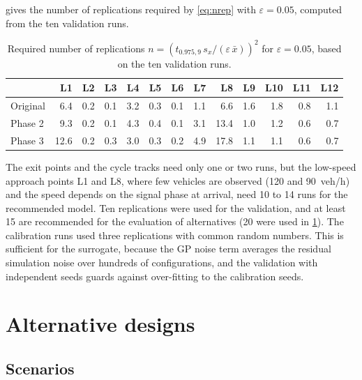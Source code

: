 \documentclass[11pt,a4paper]{article}
\begin{document}
 gives the number of replications required by \cref{eq:nrep} with
$\varepsilon = 0.05$, computed from the ten validation runs.

\begin{table}[!htb]
\centering
\caption[Required number of replications]{Required number of replications
$n = (t_{0.975,9}\,s_x/(\varepsilon\,\bar x))^2$ for $\varepsilon = 0.05$, based on the ten
validation runs.}
\label{tab:repl}
\footnotesize
\setlength{\tabcolsep}{4pt}
\begin{tabular}{lrrrrrrrrrrrr}
\toprule
& L1 & L2 & L3 & L4 & L5 & L6 & L7 & L8 & L9 & L10 & L11 & L12\\
\midrule
Original & 6.4  & 0.2 & 0.1 & 3.2 & 0.3 & 0.1 & 1.1 & 6.6  & 1.6 & 1.8 & 0.8 & 1.1\\
Phase 2  & 9.3  & 0.2 & 0.1 & 4.3 & 0.4 & 0.1 & 3.1 & 13.4 & 1.0 & 1.2 & 0.6 & 0.7\\
Phase 3  & 12.6 & 0.2 & 0.3 & 3.0 & 0.3 & 0.2 & 4.9 & 17.8 & 1.1 & 1.1 & 0.6 & 0.7\\
\bottomrule
\end{tabular}
\end{table}

The exit points and the cycle tracks need only one or two runs, but the low-speed approach points
L1 and L8, where few vehicles are observed (120 and 90~veh/h) and the speed depends on the signal
phase at arrival, need 10 to 14 runs for the recommended model. Ten replications were used for the
validation, and at least 15 are recommended for the evaluation of alternatives (20 were used in
\cref{sec:alternatives}). The calibration runs used three replications with common random numbers.
This is sufficient for the surrogate, because the GP noise term averages the residual simulation
noise over hundreds of configurations, and the validation with independent seeds guards against
over-fitting to the calibration seeds.

\section{Alternative designs}
\label{sec:alternatives}

\subsection{Scenarios}
\end{document}
